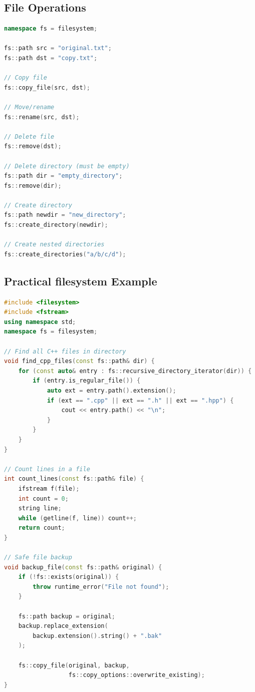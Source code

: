 \hypertarget{file-operations}{%
\subsection{File Operations}\label{file-operations}}

\begin{lstlisting}[language={C++}]
namespace fs = filesystem;

fs::path src = "original.txt";
fs::path dst = "copy.txt";

// Copy file
fs::copy_file(src, dst);

// Move/rename
fs::rename(src, dst);

// Delete file
fs::remove(dst);

// Delete directory (must be empty)
fs::path dir = "empty_directory";
fs::remove(dir);

// Create directory
fs::path newdir = "new_directory";
fs::create_directory(newdir);

// Create nested directories
fs::create_directories("a/b/c/d");
\end{lstlisting}

\hypertarget{practical-filesystem-example}{%
\subsection{Practical filesystem
Example}\label{practical-filesystem-example}}

\begin{lstlisting}[language={C++}]
#include <filesystem>
#include <fstream>
using namespace std;
namespace fs = filesystem;

// Find all C++ files in directory
void find_cpp_files(const fs::path& dir) {
    for (const auto& entry : fs::recursive_directory_iterator(dir)) {
        if (entry.is_regular_file()) {
            auto ext = entry.path().extension();
            if (ext == ".cpp" || ext == ".h" || ext == ".hpp") {
                cout << entry.path() << "\n";
            }
        }
    }
}

// Count lines in a file
int count_lines(const fs::path& file) {
    ifstream f(file);
    int count = 0;
    string line;
    while (getline(f, line)) count++;
    return count;
}

// Safe file backup
void backup_file(const fs::path& original) {
    if (!fs::exists(original)) {
        throw runtime_error("File not found");
    }
    
    fs::path backup = original;
    backup.replace_extension(
        backup.extension().string() + ".bak"
    );
    
    fs::copy_file(original, backup, 
                  fs::copy_options::overwrite_existing);
}
\end{lstlisting}


